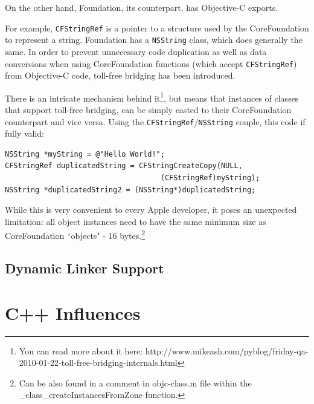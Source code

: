 \documentclass[a4paper, 11pt, fleqn]{book}
\begin{document}
On the other hand, Foundation, its counterpart, has Objective-C exports.

For example, \verb=CFStringRef= is a pointer to a structure used by the CoreFoundation to represent a string. Foundation has a \verb=NSString= class, which does generally the same. In order to prevent unnecessary code duplication as well as data conversions when using CoreFoundation functions (which accept \verb=CFStringRef=) from Objective-C code, toll-free bridging has been introduced.

There is an intricate mechanism behind it\footnote{You can read more about it here: http://www.mikeash.com/pyblog/friday-qa-2010-01-22-toll-free-bridging-internals.html}, but means that instances of classes that support toll-free bridging, can be simply casted to their CoreFoundation counterpart and vice versa. Using the \verb=CFStringRef=/\verb=NSString= couple, this code if fully valid:

\begin{verbatim}
NSString *myString = @"Hello World!";
CFStringRef duplicatedString = CFStringCreateCopy(NULL, 
                                    (CFStringRef)myString);
NSString *duplicatedString2 = (NSString*)duplicatedString;
\end{verbatim}

While this is very convenient to every Apple developer, it poses an unexpected limitation: all object instances need to have the same minimum size as CoreFoundation ``objects" - 16 bytes.\footnote{Can be also found in a comment in objc-class.m file within the \_class\_createInstancesFromZone function.}

\subsection{Dynamic Linker Support}


\section{C++ Influences}
\end{document}
